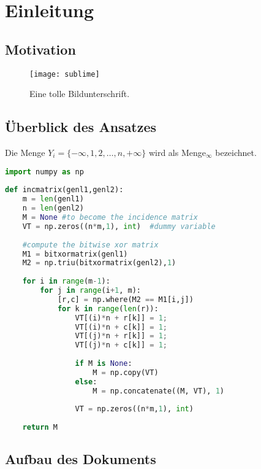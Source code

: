 \documentclass[12pt,a4paper,ngerman,twoside,open=right]{scrbook}
\begin{document}
{{%
%
%
\chapter{Einleitung}
\setcounter{page}{1}
\pagestyle{scrheadings}

\section{Motivation}
\blindtext
\begin{figure}[!b]
    \centering
    \texttt{[image: sublime]}
    \caption{Eine tolle Bildunterschrift.}
    \label{fig:chapter-2-continousDiscreteTs}
\end{figure}
\section{Überblick des Ansatzes}
\blindtext
\begin{definition}\label{def:mydefintion}
Die Menge 
$Y_i=\{-\infty,1,2,\ldots,n,+\infty\}$
wird als Menge$_\infty$ bezeichnet.
\end{definition}
\blindtext[3]
\begin{lstlisting}[language=Python, caption=Python Beispiel]
import numpy as np
 
def incmatrix(genl1,genl2):
    m = len(genl1)
    n = len(genl2)
    M = None #to become the incidence matrix
    VT = np.zeros((n*m,1), int)  #dummy variable
 
    #compute the bitwise xor matrix
    M1 = bitxormatrix(genl1)
    M2 = np.triu(bitxormatrix(genl2),1) 
 
    for i in range(m-1):
        for j in range(i+1, m):
            [r,c] = np.where(M2 == M1[i,j])
            for k in range(len(r)):
                VT[(i)*n + r[k]] = 1;
                VT[(i)*n + c[k]] = 1;
                VT[(j)*n + r[k]] = 1;
                VT[(j)*n + c[k]] = 1;
 
                if M is None:
                    M = np.copy(VT)
                else:
                    M = np.concatenate((M, VT), 1)
 
                VT = np.zeros((n*m,1), int)
 
    return M
\end{lstlisting}
\section{Aufbau des Dokuments}
\blindtext[3]
%
%
}}
\end{document}
